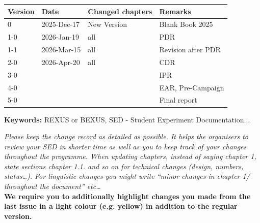 
 \begin{tabular}{|l|l|l|l|}
    \hline
    \textbf{Version}        &   \textbf{Date}   & \textbf{Changed chapters} & \textbf{Remarks}  \\\midrule
    \hline
    0       &   2025-Dec-17      &   New Version     &   Blank Book 2025 \\\hline
    1-0       & 2026-Jan-19      &   all             &   PDR \\\hline
   1-1  & 2026-Mar-15       &   all            &  Revision after PDR \\\hline
    \rowcolor{yellow} 2-0 & 2026-Apr-20 &         all          &   CDR \\\hline
    3-0       &                  &                   &   IPR \\\hline
    4-0       &                  &                   &   EAR, Pre-Campaign \\\hline
    5-0       &                  &                   &   Final report \\ \hline
 \end{tabular}

\textbf{Keywords:} REXUS or BEXUS, SED - Student Experiment Documentation...

\textit{Please keep the change record as detailed as possible. It helps the
organisers to review your SED in shorter time as well as you to keep track of
your changes throughout the programme.
When updating chapters, instead of saying chapter 1, state sections chapter
1.1. and so on for technical changes (design, numbers, status…). For
linguistic changes you might write “minor changes in chapter 1/ throughout the
document” etc… } \\
\textbf{We require you to additionally highlight changes you made from the last
issue in a light colour (e.g. yellow) in addition to the regular version.}

